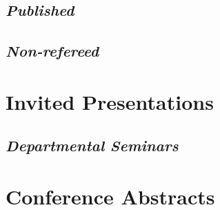 \documentclass[11pt,a4paper,sans]{moderncv}        %
\begin{document}
\subsection{\textit{Published}}
\nocite{*}



\renewcommand*{\bibliographyhead}[1]{\subsection{Non-refereed}}
\subsection{\textit{Non-refereed}}

\section{Invited Presentations}
\renewcommand*{\bibliographyhead}[1]{}

\renewcommand*{\bibliographyhead}[1]{\subsection{Departmental Seminars}}
\subsection{\textit{Departmental Seminars}}

\section{Conference Abstracts}
\renewcommand*{\bibliographyhead}[1]{}

\end{document}
